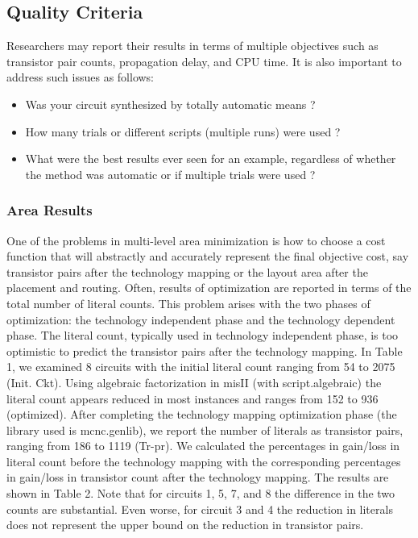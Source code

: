 {\begin{pespace}
\subsection{Quality Criteria}

Researchers may report their results in terms of multiple objectives
such as transistor pair counts, propagation delay, and CPU time.  
It is also important to address such issues as follows:

\begin{itemize}
\item Was your circuit synthesized by totally automatic means ?

\item How many trials or different scripts (multiple runs) were used ?

\item What were the best results ever seen for an example, regardless of
whether the method was automatic or if multiple trials were used ?
\end{itemize}

\subsubsection{ Area Results}

One of the problems in multi-level area minimization is
how to choose a cost function that will
abstractly and accurately
represent the final objective cost, say
transistor pairs after the technology mapping or the layout area
after the placement and routing.
Often, results of optimization are reported in terms of
the total number of literal counts. 
This problem arises with the two phases of optimization: the
technology independent
phase and the technology dependent phase. 
The literal count, typically used in technology independent phase, is
too optimistic to predict the transistor pairs after the technology
mapping. 
In Table 1, we examined 8 circuits with the initial literal 
count ranging from 54 to 2075 (Init. Ckt).
Using algebraic factorization in misII (with script.algebraic)
the literal count appears reduced in most 
instances and ranges from 152 to 936 (optimized). 
After completing the technology mapping optimization phase (the library
used is mcnc.genlib), we report the number of literals as
transistor pairs, ranging from 186 to 1119 (Tr-pr). 
We calculated the
percentages in gain/loss in literal count before the technology mapping with
the corresponding percentages in gain/loss in transistor count after the
technology mapping. The results are shown in Table 2.
Note that for circuits 1, 5, 7, and 8 the difference in the two
counts are
substantial. Even worse, for circuit 3 and 4 
the reduction in literals does not
represent the upper bound on the reduction in transistor pairs.


\end{pespace}}
